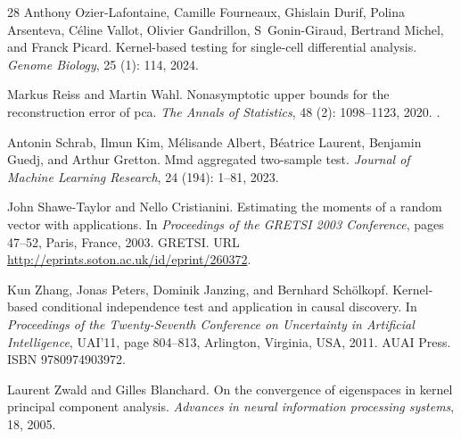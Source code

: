 \documentclass[twoside,11pt]{article}
\begin{document}
\begin{thebibliography}{28}
	Anthony Ozier-Lafontaine, Camille Fourneaux, Ghislain Durif, Polina Arsenteva,
	C{\'e}line Vallot, Olivier Gandrillon, S~Gonin-Giraud, Bertrand Michel, and
	Franck Picard.
	\newblock Kernel-based testing for single-cell differential analysis.
	\newblock \emph{Genome Biology}, 25 (1): 114,
	2024{}.
	
	Markus Reiss and Martin Wahl.
	\newblock Nonasymptotic upper bounds for the reconstruction error of pca.
	\newblock \emph{The Annals of Statistics}, 48 (2):
	1098--1123, 2020.
	\newblock {}.
	
	Antonin Schrab, Ilmun Kim, M{\'e}lisande Albert, B{\'e}atrice Laurent, Benjamin
	Guedj, and Arthur Gretton.
	\newblock Mmd aggregated two-sample test.
	\newblock \emph{Journal of Machine Learning Research}, 24
	(194): 1--81, 2023.
	
	John Shawe-Taylor and Nello Cristianini.
	\newblock Estimating the moments of a random vector with applications.
	\newblock In \emph{Proceedings of the GRETSI 2003 Conference}, pages 47--52,
	Paris, France, 2003. GRETSI.
	\newblock URL \url{http://eprints.soton.ac.uk/id/eprint/260372}.
	
	Kun Zhang, Jonas Peters, Dominik Janzing, and Bernhard Sch\"{o}lkopf.
	\newblock Kernel-based conditional independence test and application in causal
	discovery.
	\newblock In \emph{Proceedings of the Twenty-Seventh Conference on Uncertainty
		in Artificial Intelligence}, UAI'11, page 804–813, Arlington, Virginia,
	USA, 2011. AUAI Press.
	\newblock ISBN 9780974903972.
	
	Laurent Zwald and Gilles Blanchard.
	\newblock On the convergence of eigenspaces in kernel principal component
	analysis.
	\newblock \emph{Advances in neural information processing systems}, 18, 2005.
	
\end{thebibliography}
\end{document}
